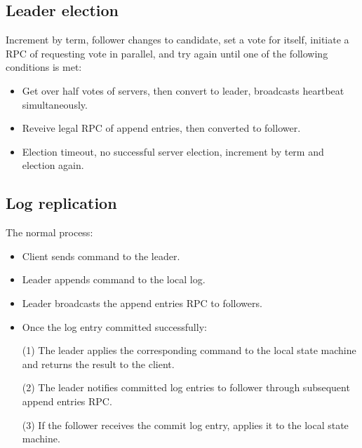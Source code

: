 \documentclass{report}
\begin{document}
\subsection{Leader election}
Increment by term, follower changes to candidate, set a vote for itself, initiate a RPC of requesting vote in parallel, and try again until one of the following conditions is met:
\begin{itemize}
\item Get over half votes of servers, then convert to leader, broadcasts heartbeat simultaneously.
\item Reveive legal RPC of append entries, then converted to follower.
\item Election timeout, no successful server election, increment by term and election again.
\end{itemize}

\subsection{Log replication}
The normal process:
\begin{itemize}
\item Client sends command to the leader.
\item Leader appends command to the local log.
\item Leader broadcasts the append entries RPC to followers.
\item Once the log entry committed successfully:\par
(1) The leader applies the corresponding command to the local state machine and returns the result to the client.\par
(2) The leader notifies committed log entries to follower through subsequent append entries RPC.\par
(3) If the follower receives the commit log entry, applies it to the local state machine.
\end{itemize}
\end{document}
